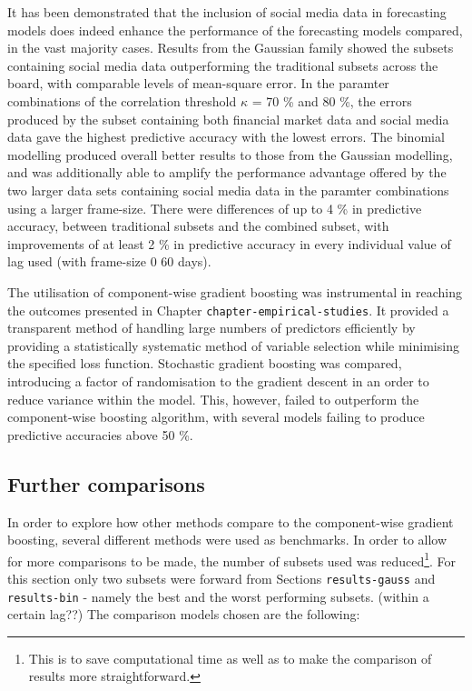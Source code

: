 \documentclass{article}
\begin{document}
It has been demonstrated that the inclusion of social media data in forecasting models does indeed enhance the performance of the forecasting models compared, in the vast majority cases. Results from the Gaussian family showed the subsets containing social media data outperforming the traditional subsets across the board, with comparable levels of mean-square error. In the paramter combinations of the correlation threshold $\kappa$ = 70 \% and 80 \%, the errors produced by the subset containing both financial market data and social media data gave the highest predictive accuracy with the lowest errors. The binomial modelling produced overall better results to those from the Gaussian modelling, and was additionally able to amplify the performance advantage offered by the two larger data sets containing social media data in the paramter combinations using a larger frame-size. There were differences of up to 4 \% in predictive accuracy, between traditional subsets and the combined subset, with improvements of at least 2 \% in predictive accuracy in every individual value of lag used (with frame-size 0 60 days). 

The utilisation of component-wise gradient boosting was instrumental in reaching the outcomes presented in Chapter \texttt{chapter-empirical-studies}. It provided a transparent method of handling large numbers of predictors efficiently by providing a statistically systematic method of variable selection while minimising the specified loss function. Stochastic gradient boosting was compared, introducing a factor of randomisation to the gradient descent in an order to reduce variance within the model. This, however, failed to outperform the component-wise boosting algorithm, with several models failing to produce predictive accuracies above 50 \%. 


\subsection{Further comparisons}
\label{sec-1-3}

In order to explore how other methods compare to the component-wise gradient boosting, several different methods were used as benchmarks. In order to allow for more comparisons to be made, the number of subsets used was reduced\footnote{This is to save computational time as well as to make the comparison of results more straightforward.}. For this section only two subsets were forward from Sections \texttt{results-gauss} and \texttt{results-bin} - namely the best and the worst performing subsets. (within a certain lag??)
The comparison models chosen are the following:
\end{document}
